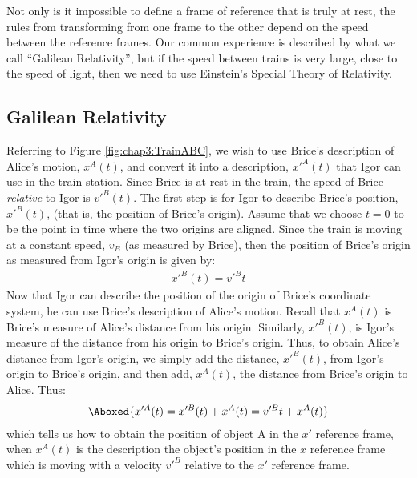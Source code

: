 Not only is it impossible to define a frame of reference that is truly at rest, the rules from transforming from one frame to the other depend on the speed between the reference frames. Our common experience is described by what we call ``Galilean Relativity'', but if the speed between trains is very large, close to the speed of light, then we need to use Einstein's Special Theory of Relativity.

\subsection{Galilean Relativity}
Referring to Figure \ref{fig:chap3:TrainABC}, we wish to use Brice's description of Alice's motion, $x^A(t)$, and convert it into a description, $x'^A(t)$ that Igor can use in the train station. Since Brice is at rest in the train, the speed of Brice \textit{relative} to Igor is $v'^B(t)$. The first step is for Igor to describe Brice's position, $x'^B(t)$, (that is, the position of Brice's origin). Assume that we choose $t=0$ to be the point in time where the two origins are aligned. Since the train is moving at a constant speed, $v_B$ (as measured by Brice), then the position of Brice's origin as measured from Igor's origin is given by:
\begin{align*}
x'^B(t)=v'^Bt
\end{align*}
Now that Igor can describe the position of the origin of Brice's coordinate system, he can use Brice's description of Alice's motion. Recall that $x^A(t)$ is Brice's measure of Alice's distance from his origin. Similarly, $x'^B(t)$, is Igor's measure of the distance from his origin to Brice's origin. Thus, to obtain Alice's distance from Igor's origin, we simply add the distance, $x'^B(t)$, from Igor's origin to Brice's origin, and then add, $x^A(t)$, the distance from Brice's origin to Alice. Thus:
\begin{align}
\Aboxed{x'^A(t)=x'^B(t)+x^A(t)=v'^Bt+x^A(t)}
\end{align}
which tells us how to obtain the position of object A in the $x'$ reference frame, when $x^A(t)$ is the description the object's position in the $x$ reference frame which is moving with a velocity $v'^B$ relative to the $x'$ reference frame.

